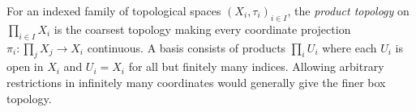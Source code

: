 
For an indexed family of topological spaces $(X_i,\tau_i)_{i\in I}$, the \emph{product topology} on $\prod_{i\in I}X_i$ is the coarsest topology making every coordinate projection $\pi_i:\prod_jX_j\to X_i$ continuous. A basis consists of products $\prod_i U_i$ where each $U_i$ is open in $X_i$ and $U_i=X_i$ for all but finitely many indices. Allowing arbitrary restrictions in infinitely many coordinates would generally give the finer box topology.
